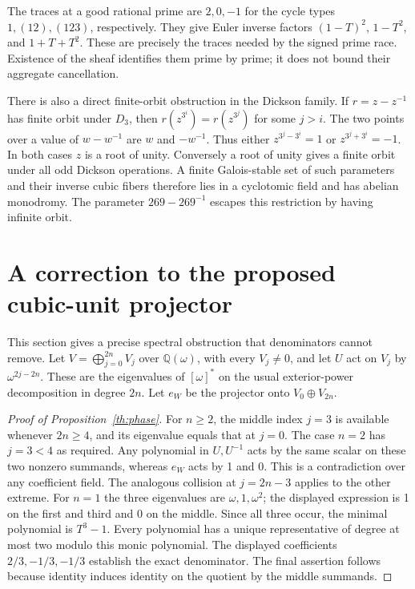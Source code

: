 \documentclass[11pt]{article}
\theoremstyle{remark}\newtheorem{remark}[theorem]{Remark}
\newcommand{\Q}{\mathbb Q}\newcommand{\Z}{\mathbb Z}\newcommand{\C}{\mathbb C}
\begin{document}
The traces at a good rational prime are $2,0,-1$ for the cycle types $1,(12),(123)$, respectively. They give Euler inverse factors $(1-T)^2$, $1-T^2$, and $1+T+T^2$. These are precisely the traces needed by the signed prime race. Existence of the sheaf identifies them prime by prime; it does not bound their aggregate cancellation.

There is also a direct finite-orbit obstruction in the Dickson family. If $r=z-z^{-1}$ has finite orbit under $D_3$, then $r(z^{3^i})=r(z^{3^j})$ for some $j>i$. The two points over a value of $w-w^{-1}$ are $w$ and $-w^{-1}$. Thus either $z^{3^j-3^i}=1$ or $z^{3^j+3^i}=-1$. In both cases $z$ is a root of unity. Conversely a root of unity gives a finite orbit under all odd Dickson operations. A finite Galois-stable set of such parameters and their inverse cubic fibers therefore lies in a cyclotomic field and has abelian monodromy. The parameter $269-269^{-1}$ escapes this restriction by having infinite orbit.

\section{A correction to the proposed cubic-unit projector}
This section gives a precise spectral obstruction that denominators cannot remove. Let $V=\bigoplus_{j=0}^{2n}V_j$ over $\Q(\omega)$, with every $V_j\ne0$, and let $U$ act on $V_j$ by $\omega^{2j-2n}$. These are the eigenvalues of $[\omega]^*$ on the usual exterior-power decomposition in degree $2n$. Let $e_W$ be the projector onto $V_0\oplus V_{2n}$.

\begin{proof}[Proof of Proposition~\ref{th:phase}]
For $n\ge2$, the middle index $j=3$ is available whenever $2n\ge4$, and its eigenvalue equals that at $j=0$. The case $n=2$ has $j=3<4$ as required. Any polynomial in $U,U^{-1}$ acts by the same scalar on these two nonzero summands, whereas $e_W$ acts by 1 and 0. This is a contradiction over any coefficient field. The analogous collision at $j=2n-3$ applies to the other extreme. For $n=1$ the three eigenvalues are $\omega,1,\omega^2$; the displayed expression is 1 on the first and third and 0 on the middle. Since all three occur, the minimal polynomial is $T^3-1$. Every polynomial has a unique representative of degree at most two modulo this monic polynomial. The displayed coefficients $2/3,-1/3,-1/3$ establish the exact denominator. The final assertion follows because identity induces identity on the quotient by the middle summands.
\end{proof}
\end{document}
